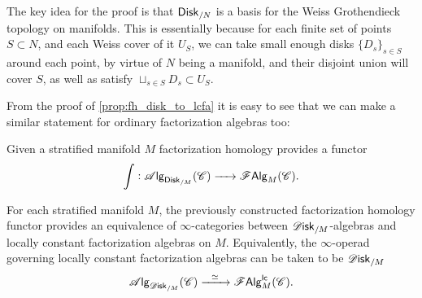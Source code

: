 \documentclass[../text]{subfiles}
\begin{document}
\begin{remark}
    The key idea for the proof is that $\disk[r]_{/N}$ is a basis for the Weiss Grothendieck topology on manifolds. This is essentially because for each finite set of points $S \subset N$, and each Weiss cover of it $U_S$, we can take small enough disks $\{ D_s \}_{s \in S}$ around each point, by virtue of $N$ being a manifold, and their disjoint union will cover $S$, as well as satisfy $\sqcup_{s \in S} D_s \subset U_S$.
\end{remark}

From the proof of \cref{prop:fh_disk_to_lcfa} it is easy to see that we can make a similar statement for ordinary factorization algebras too:

\begin{corollary}\label{cor:fh_disk_to_falg}
    Given a stratified manifold $M$ factorization homology provides a functor
    \begin{equation}
        \int: \alg{\disk[r]_{/M}} (\catC) \xrightarrow{\ \ \ \ } \falg_{M} (\catC).
    \end{equation}
\end{corollary}

\begin{theorem}\label{thm:disk_alg=lcfa}
    For each stratified manifold $M$, the previously constructed factorization homology functor provides an equivalence of $\infty$-categories between $\disk_{/M}$-algebras and locally constant factorization algebras on $M$. Equivalently, the $\infty$-operad governing locally constant factorization algebras can be taken to be $\disk_{/M}$
    \begin{equation}
        \alg{\disk_{/M}} (\catC) \xrightarrow{\ \ \simeq \ \ } \lcfa_M (\catC).
    \end{equation}
\end{theorem}
\end{document}
